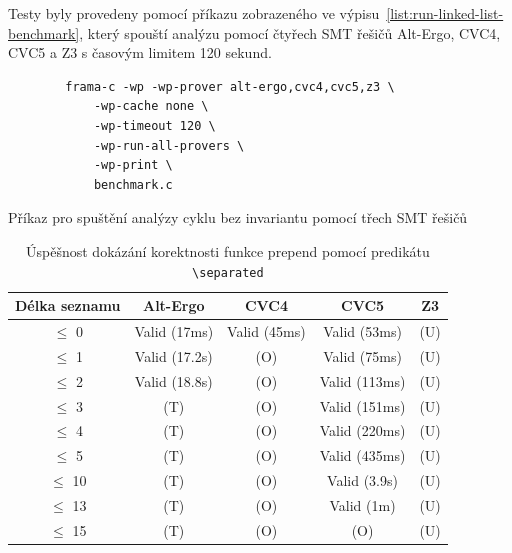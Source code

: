 
Testy byly provedeny pomocí příkazu zobrazeného ve výpisu~\ref{list:run-linked-list-benchmark},
který spouští analýzu pomocí čtyřech SMT řešičů Alt-Ergo, CVC4, CVC5 a Z3 s časovým limitem 120 sekund.

\begin{listing}[H]
    \begin{verbatim}
        frama-c -wp -wp-prover alt-ergo,cvc4,cvc5,z3 \
            -wp-cache none \
            -wp-timeout 120 \
            -wp-run-all-provers \
            -wp-print \
            benchmark.c
    \end{verbatim}
    \caption{Příkaz pro spuštění analýzy cyklu bez invariantu pomocí třech SMT řešičů}
    \label{list:run-linked-list-benchmark}
\end{listing}


\begin{table}[H]
    \centering
    \begin{tabular}{|c|c|c|c|c|}
        \hline
        Délka seznamu & Alt-Ergo      & CVC4         & CVC5          & Z3  \\
        \hline
        $\leq$ 0      & Valid (17ms)  & Valid (45ms) & Valid (53ms)  & (U) \\
        $\leq$ 1      & Valid (17.2s) & (O)          & Valid (75ms)  & (U) \\
        $\leq$ 2      & Valid (18.8s) & (O)          & Valid (113ms) & (U) \\
        $\leq$ 3      & (T)           & (O)          & Valid (151ms) & (U) \\
        $\leq$ 4      & (T)           & (O)          & Valid (220ms) & (U) \\
        $\leq$ 5      & (T)           & (O)          & Valid (435ms) & (U) \\
        $\leq$ 10     & (T)           & (O)          & Valid (3.9s)  & (U) \\
        $\leq$ 13     & (T)           & (O)          & Valid (1m)    & (U) \\
        $\leq$ 15     & (T)           & (O)          & (O)           & (U) \\
        \hline
    \end{tabular}
    \caption{Úspěšnost dokázání korektnosti funkce prepend pomocí predikátu \texttt{\textbackslash separated}}
    \label{tab:prepend-smt-success}
\end{table}

